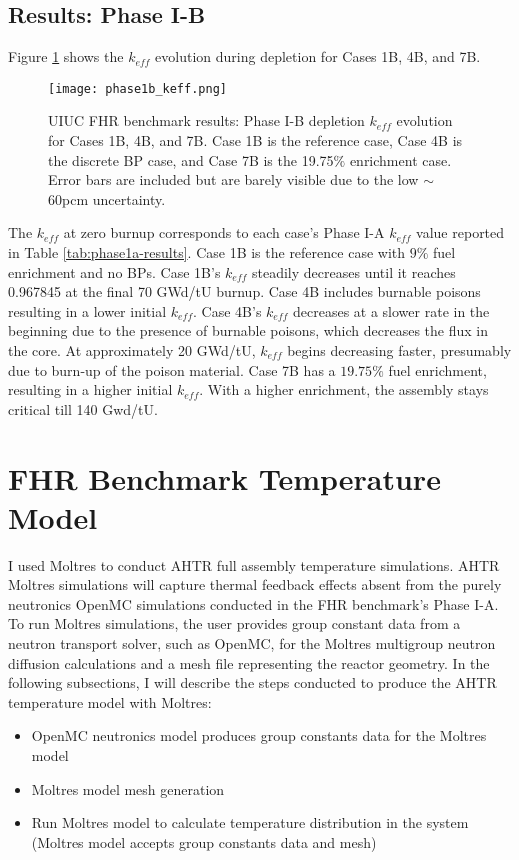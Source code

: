 \subsection{Results: Phase I-B}
\label{sec:fhr-benchmark-results-ib}
Figure \ref{fig:phase1b_keff} shows the $k_{eff}$ evolution during depletion 
for Cases 1B, 4B, and 7B.
\begin{figure}[htbp]
    \centering
    \texttt{[image: phase1b\_keff.png]} 
    \caption{\gls{UIUC} \gls{FHR} benchmark results: Phase I-B depletion 
    $k_{eff}$ evolution for Cases 1B, 4B, and 7B. Case 1B is the reference case, 
    Case 4B is the discrete \acrlong{BP} case, and Case 7B is the 19.75$\%$ 
    enrichment case. Error bars are included but are barely visible due to the 
    low $\sim$60pcm uncertainty.}
    \label{fig:phase1b_keff}
\end{figure}
The $k_{eff}$ at zero burnup corresponds to each case's Phase I-A $k_{eff}$ value 
reported in Table \ref{tab:phase1a-results}. 
Case 1B is the reference case with $9\%$ fuel enrichment and no \glspl{BP}. 
Case 1B's $k_{eff}$ steadily decreases until it reaches 0.967845 at the final 70 
GWd/tU burnup. 
Case 4B includes burnable poisons resulting in a lower initial $k_{eff}$. 
Case 4B's $k_{eff}$ decreases at a slower rate in the beginning due to the presence of 
burnable poisons, which decreases the flux in the core. 
At approximately 20 GWd/tU, $k_{eff}$ begins decreasing faster, presumably
due to burn-up of the poison material.   
Case 7B has a $19.75\%$ fuel enrichment, resulting in a higher initial $k_{eff}$. 
With a higher enrichment, the assembly stays critical till 140 Gwd/tU. 

\section{FHR Benchmark Temperature Model}
\label{sec:fhr-bm-temp}
I used Moltres \cite{lindsay_moltres_2017} to conduct \gls{AHTR} full assembly 
temperature simulations. 
AHTR Moltres simulations will capture thermal feedback effects absent from the purely 
neutronics OpenMC simulations conducted in the \gls{FHR} benchmark's Phase I-A.
To run Moltres simulations, the user provides group constant data from a neutron 
transport solver, such as OpenMC, for the Moltres multigroup neutron diffusion 
calculations and a mesh file representing the reactor geometry. 
In the following subsections, I will describe the steps conducted to produce the 
\gls{AHTR} temperature model with Moltres:
\begin{itemize}
    \item OpenMC neutronics model produces group constants data for the Moltres model
    \item Moltres model mesh generation
    \item Run Moltres model to calculate temperature distribution in the system 
    (Moltres model accepts group constants data and mesh) 
\end{itemize}


